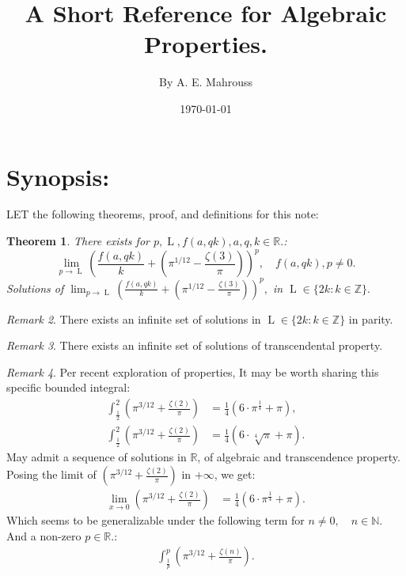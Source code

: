 \documentclass[10pt]{article}
\title{%
	\vspace{-1.5em}%
	\large\textbf{A Short Reference for Algebraic Properties.}%
}
\author{By A. E. Mahrouss}
\date{\today}
\theoremstyle{plain}
\newtheorem{theorem}{Theorem}[section]
\theoremstyle{definition}
\theoremstyle{remark}
\newtheorem{remark}[theorem]{Remark}
\begin{document}

\maketitle
\tableofcontents
\newpage

\section{Synopsis:}

\lettrine[lines=1, lhang=0.1, loversize=0.2]{L}ET the following theorems, proof, and definitions for this note:

\begin{theorem}
	There exists for $p, \operatorname{L}, f(a, qk), a, q, k \in \mathbb{R}.$:
	\begin{equation}
		\lim_{p \to \operatorname{L}} (\frac{f(a, qk)}{k} + (\pi^{1/12} - \frac{\zeta(3)}{\pi}))^p, \quad f(a, qk), p \neq 0.
	\end{equation}
	Solutions of $\lim_{p \to \operatorname{L}} (\frac{f(a, qk)}{k} + (\pi^{1/12} - \frac{\zeta(3)}{\pi}))^p,$ in  $\operatorname{L} \in \{2k : k \in \mathbb{Z}\}.$
\end{theorem}
\begin{remark}
	There exists an infinite set of solutions in $\operatorname{L} \in \{2k : k \in \mathbb{Z}\}$ in parity.
\end{remark}
\begin{remark}
There exists an infinite set of solutions of transcendental property.
\end{remark}

\begin{remark}
	Per recent exploration of properties, It may be worth sharing this specific bounded integral:
	\begin{align*}
		\int_{\frac{1}{2}}^{2} (\pi^{3/12} + \frac{\zeta(2)}{\pi}) &= \frac{1}{4} (6 \cdot \pi^{\frac{1}{4}} + \pi),\\
		\int_{\frac{1}{2}}^{2} (\pi^{3/12} + \frac{\zeta(2)}{\pi}) &= \frac{1}{4} (6 \cdot \sqrt[4]{\pi} + \pi).
	\end{align*}
	May admit a sequence of solutions in $\mathbb{R}$, of algebraic and transcendence property. Posing the limit of $(\pi^{3/12} + \frac{\zeta(2)}{\pi})$ in $+\infty$, we get:
	\begin{align*}
	\lim_{x \to 0} (\pi^{3/12} + \frac{\zeta(2)}{\pi}) &= \frac{1}{4} (6 \cdot \pi^{\frac{1}{4}} + \pi).
	\end{align*}
	Which seems to be generalizable under the following term for $n \neq 0, \quad n \in \mathbb{N}.$ And a non-zero $p \in \mathbb{R}.$:
	\begin{align*}
		\int_{\frac{1}{p}}^{p} (\pi^{3/12} + \frac{\zeta(n)}{\pi}).
	\end{align*}
\end{remark}
\end{document}
